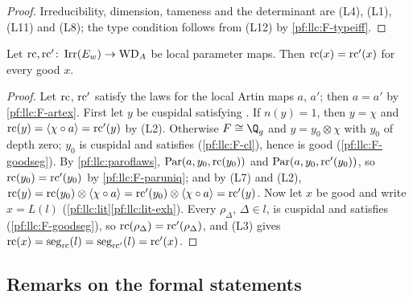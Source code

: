 \begin{proof}
Irreducibility, dimension, tameness and the determinant are (L4), (L1), (L11) and (L8); the type condition follows from (L12)
by \ref{pf:llc:F-typeiff}.
\end{proof}

\begin{proposition}\label{pf:llc:unique}
Let $\mathrm{rc},\mathrm{rc}'\colon\operatorname{Irr}(E_w)\to\mathrm{WD}_A$ be local parameter maps. Then $\mathrm{rc}(x)=\mathrm{rc}'(x)$ for every good $x$.
\end{proposition}

\begin{proof}
Let $\mathrm{rc}$, $\mathrm{rc}'$ satisfy the laws for the local Artin maps $a$, $a'$; then $a=a'$ by \ref{pf:llc:F-artex}. First let $y$ be
cuspidal satisfying \llcGo{}. If $n(y)=1$, then $y=\chi$ and $\mathrm{rc}(y)=\langle\chi\circ a\rangle=\mathrm{rc}'(y)$ by (L2). Otherwise
$F\cong\Q_g$ and $y=y_0\otimes\chi$ with $y_0$ of depth zero; $y_0$ is cuspidal and satisfies \llcGo{} (\ref{pf:llc:F-cl}), hence is
good (\ref{pf:llc:F-goodseg}). By \cref{pf:llc:paroflaws}, $\operatorname{Par}(a,y_0,\mathrm{rc}(y_0))$ and $\operatorname{Par}(a,y_0,\mathrm{rc}'(y_0))$, so
$\mathrm{rc}(y_0)=\mathrm{rc}'(y_0)$ by \ref{pf:llc:F-paruniq}; and by (L7) and (L2),
$\mathrm{rc}(y)=\mathrm{rc}(y_0)\otimes\langle\chi\circ a\rangle=\mathrm{rc}'(y_0)\otimes\langle\chi\circ a\rangle=\mathrm{rc}'(y)$. Now let $x$ be good and write
$x=L(l)$ (\cref{pf:llc:lit}\ref{pf:llc:lit-exh}). Every $\rho_\Delta$, $\Delta\in l$, is cuspidal and satisfies \llcGo{}
(\ref{pf:llc:F-goodseg}), so $\mathrm{rc}(\rho_\Delta)=\mathrm{rc}'(\rho_\Delta)$, and (L3) gives $\mathrm{rc}(x)=\operatorname{seg}_{\mathrm{rc}}(l)=\operatorname{seg}_{\mathrm{rc}'}(l)=
\mathrm{rc}'(x)$.
\end{proof}

\subsection{Remarks on the formal statements}\label{pf:llc:sec-remarks}

